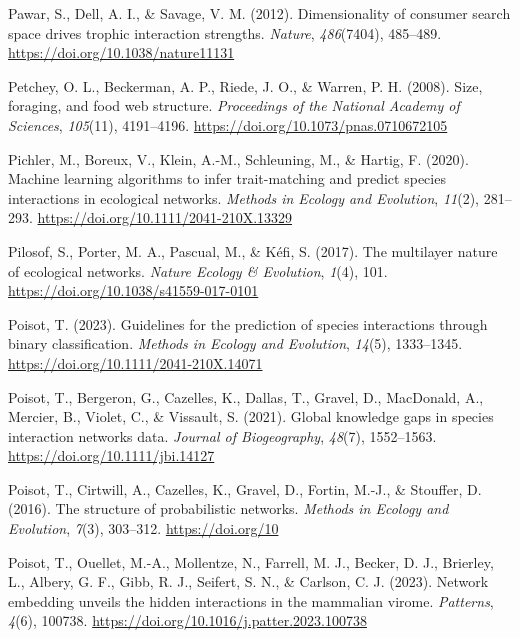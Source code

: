 \documentclass[
]{article}
\newlength{\cslhangindent}
\newenvironment{CSLReferences}[2] %
 {\begin{list}{}{%
  \setlength{\itemindent}{0pt}
  \setlength{\leftmargin}{0pt}
  \setlength{\parsep}{0pt}
  \ifodd #1
   \setlength{\leftmargin}{\cslhangindent}
   \setlength{\itemindent}{-1\cslhangindent}
  \fi
  \setlength{\itemsep}{#2\baselineskip}}}
 {\end{list}}
\begin{document}
\begin{CSLReferences}{1}{0}
Pawar, S., Dell, A. I., \& Savage, V. M. (2012). Dimensionality of
consumer search space drives trophic interaction strengths.
\emph{Nature}, \emph{486}(7404), 485--489.
\url{https://doi.org/10.1038/nature11131}

Petchey, O. L., Beckerman, A. P., Riede, J. O., \& Warren, P. H. (2008).
Size, foraging, and food web structure. \emph{Proceedings of the
National Academy of Sciences}, \emph{105}(11), 4191--4196.
\url{https://doi.org/10.1073/pnas.0710672105}

Pichler, M., Boreux, V., Klein, A.-M., Schleuning, M., \& Hartig, F.
(2020). Machine learning algorithms to infer trait-matching and predict
species interactions in ecological networks. \emph{Methods in Ecology
and Evolution}, \emph{11}(2), 281--293.
\url{https://doi.org/10.1111/2041-210X.13329}

Pilosof, S., Porter, M. A., Pascual, M., \& Kéfi, S. (2017). The
multilayer nature of ecological networks. \emph{Nature Ecology \&
Evolution}, \emph{1}(4), 101.
\url{https://doi.org/10.1038/s41559-017-0101}

Poisot, T. (2023). Guidelines for the prediction of species interactions
through binary classification. \emph{Methods in Ecology and Evolution},
\emph{14}(5), 1333--1345. \url{https://doi.org/10.1111/2041-210X.14071}

Poisot, T., Bergeron, G., Cazelles, K., Dallas, T., Gravel, D.,
MacDonald, A., Mercier, B., Violet, C., \& Vissault, S. (2021). Global
knowledge gaps in species interaction networks data. \emph{Journal of
Biogeography}, \emph{48}(7), 1552--1563.
\url{https://doi.org/10.1111/jbi.14127}

Poisot, T., Cirtwill, A., Cazelles, K., Gravel, D., Fortin, M.-J., \&
Stouffer, D. (2016). The structure of probabilistic networks.
\emph{Methods in Ecology and Evolution}, \emph{7}(3), 303--312.
\url{https://doi.org/10}

Poisot, T., Ouellet, M.-A., Mollentze, N., Farrell, M. J., Becker, D.
J., Brierley, L., Albery, G. F., Gibb, R. J., Seifert, S. N., \&
Carlson, C. J. (2023). Network embedding unveils the hidden interactions
in the mammalian virome. \emph{Patterns}, \emph{4}(6), 100738.
\url{https://doi.org/10.1016/j.patter.2023.100738}


\end{CSLReferences}
\end{document}
